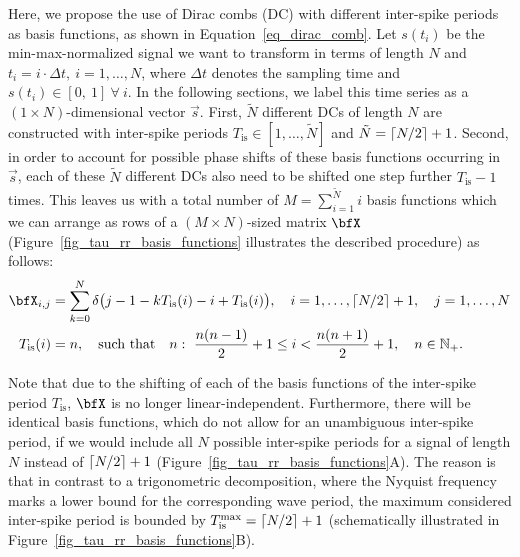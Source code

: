 \documentclass[entropy,article,accept,pdftex,moreauthors]{Definitions/mdpi}
\DeclarePairedDelimiter\ceil{\lceil}{\rceil}
\begin{document}
Here, we propose the use of Dirac combs (DC) with 
different inter-spike periods as basis functions, as shown in Equation~\eqref{eq_dirac_comb}. Let $s(t_i)$ be the min-max-normalized signal we want to transform in terms of length $N$ and 
$t_i=i\cdot \Delta t,~i=1,\ldots,N$, where $\Delta t$ denotes the sampling time and $s(t_i) \in [0,\ 1]\ \forall\ i$. In the following sections, we label this time series as a $(1\times N)$-dimensional 
vector $\vec{s}$. 
First, $\tilde{N}$ different DCs of length $N$ are constructed with inter-spike periods $T_\text{is} \in [1,\ldots,\tilde{N}]$ and $\tilde{N}=\ceil*{N/2}+1$. Second, in order to account 
for possible phase shifts of 
these basis functions occurring in $\vec{s}$, each of these $\tilde{N}$ different DCs also need to be shifted one step further $T_\text{is}-1$ times. This leaves us with a total number of 
$M = \sum_{i=1}^{\tilde{N}}i$ 
basis functions which we can arrange as rows of a $(M\times N)$-sized matrix $\bfX$
(Figure~\ref{fig_tau_rr_basis_functions} illustrates the described procedure) as follows:
\begin{align}
\label{eq_basis_matrix} 
\bfX_{i,j} &= \sum_{k=0}^{N}\delta\bigl(j-1-kT_\text{is}(i)-i+T_\text{is}(i) \bigr), \quad i=1,\dots,\ceil*{N/2}+1, \quad j=1,\dots,N\\
\label{eq_T_is} T_\text{is}(i)&= n, \quad \text{such that}\quad n:~ \frac{n(n-1)}{2} + 1 \leq i <  \frac{n(n+1)}{2} + 1,\quad n \in \mathbb{N}_+.
\end{align}

Note that due to the shifting of each of the basis functions of the inter-spike period $T_\text{is}$, $\bfX$ is no longer linear-independent. 
Furthermore, there will be identical basis functions, which do not allow for an unambiguous inter-spike period, 
if we would include all $N$ possible inter-spike periods for a signal of length $N$ instead of $\ceil*{N/2}+1$ (Figure~\ref{fig_tau_rr_basis_functions}A).
The reason is that in contrast to a trigonometric decomposition, where the Nyquist frequency marks a lower bound for the corresponding wave period, 
the maximum considered inter-spike period is bounded by $T_{\text{is}}^{\text{max}} = \ceil*{N/2}+1$ (schematically illustrated in 
Figure~\ref{fig_tau_rr_basis_functions}B). 
\end{document}
